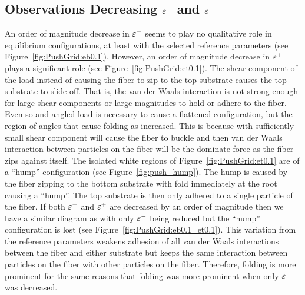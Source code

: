 \subsection{Observations Decreasing $\varepsilon^-$ and $\varepsilon^+$} \label{subsection:push:eps}

An order of magnitude decrease in $\varepsilon^-$ seems to play no qualitative role in equilibrium configurations, at least with the selected reference parameters (see Figure~\ref{fig:PushGrid:eb0.1}). However, an order of magnitude decrease in $\varepsilon^+$ plays a significant role (see Figure~\ref{fig:PushGrid:et0.1}). The shear component of the load instead of causing the fiber to zip to the top substrate causes the top substrate to slide off. That is, the van der Waals interaction is not strong enough for large shear components or large magnitudes to hold or adhere to the fiber. Even so and angled load is necessary to cause a flattened configuration, but the region of angles that cause folding as increased. This is because with sufficiently small shear component will cause the fiber to buckle and then van der Waals interaction between particles on the fiber will be the dominate force as the fiber zips against itself. The isolated white regions of Figure~\ref{fig:PushGrid:et0.1} are of a ``hump'' configuration (see Figure~\ref{fig:push_hump}). The hump is caused by the fiber zipping to the bottom substrate with fold immediately at the root causing a ``hump''. The top substrate is then only adhered to a single particle of the fiber. If both $\varepsilon^-$ and $\varepsilon^+$ are decreased by an order of magnitude then we have a similar diagram as with only $\varepsilon^-$ being reduced but the ``hump'' configuration is lost (see Figure~\ref{fig:PushGrid:eb0.1_et0.1}). This variation from the reference parameters weakens adhesion of all van der Waals interactions between the fiber and either substrate but keeps the same interaction between particles on the fiber with other particles on the fiber. Therefore, folding is more prominent for the same reasons that folding was more prominent when only $\varepsilon^-$ was decreased.
	
